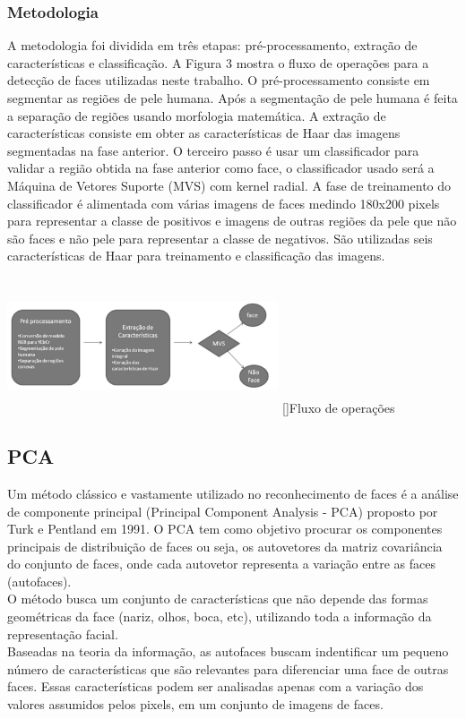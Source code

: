 \documentclass[a4paper,11pt]{article}
\newenvironment{Figure}
  {\par\medskip\noindent\minipage{\linewidth}}
    {\endminipage\par\medskip}
\begin{document}
\begin{multicols}{2}
\subsubsection{Metodologia}
A metodologia foi dividida em três etapas: pré-processamento, extração de características e classificação. A Figura 3 mostra o fluxo de operações para a detecção de faces utilizadas neste trabalho.
O pré-processamento consiste em segmentar as regiões de pele humana. Após a segmentação de pele humana é feita a separação de regiões usando morfologia matemática.
A extração de características consiste em obter as características de Haar das imagens segmentadas na fase anterior.
O terceiro passo é usar um classificador para validar a região obtida na fase anterior como face, o classificador usado será a Máquina de Vetores Suporte (MVS) com kernel radial.
A fase de treinamento do classificador é alimentada com várias imagens de faces medindo 180x200 pixels para representar a classe de positivos e imagens de outras regiões da pele que não são faces e não pele para representar a classe de negativos. São utilizadas seis características de
Haar para treinamento e classificação das imagens.
\begin{Figure}
	\centering 
	\includegraphics[width=8cm, height=4cm]{imagem3}
	[]{Fluxo de operações}
	\label{medium}
\end{Figure}

\subsection{PCA}
Um método clássico e vastamente utilizado no reconhecimento de faces é a análise de componente principal (Principal Component Analysis - PCA) proposto por Turk e Pentland em 1991. O PCA tem como objetivo procurar os componentes principais de distribuição de faces ou seja, os autovetores da matriz covariância do conjunto de faces, onde cada autovetor representa a variação entre as faces (autofaces).\\
O método  busca um conjunto de características que não depende das formas geométricas da face (nariz, olhos, boca, etc), utilizando toda a informação da representação facial.\\
Baseadas na teoria da informação, as autofaces buscam indentificar um pequeno número de características que são relevantes para diferenciar uma face de outras faces. Essas características podem ser analisadas apenas com a variação dos valores assumidos pelos pixels, em um conjunto de imagens de faces.


\end{multicols}
\end{document}
